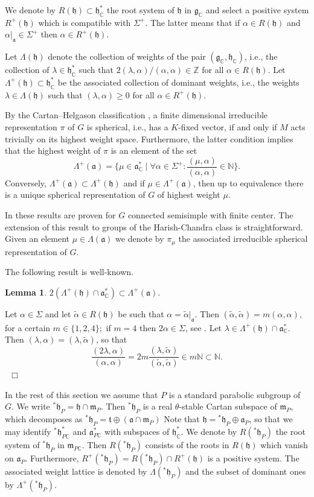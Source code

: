 \documentclass[12pt,a4paper]{article}
\newtheorem{Lemma}[Thm]{Lemma}
\newenvironment{lemma}[0]{\begin{Lemma}\noindent}%
{\end{Lemma}}
\def\proof{\par\noindent{\it Proof.}{\ }{\ }}
\def\qed{~\hfill\hbox{$\Box$}\medbreak}
\def\msy#1{{\mathbb #1}}
\def\C{{\msy C}}
\def\N{{\msy N}}
\def\Z{{\msy Z}}
\def\ga{\alpha}
\def\gl{\lambda}
\def\gS{\Sigma}
\def\got#1{\mathfrak #1}
\def\fa{{\got a}}
\def\fg{{\got g}}
\def\fh{{\got h}}
\def\fm{{\got m}}
\def\ft{{\got t}}
\def\iC{{\scriptscriptstyle \C}}
\numberwithin{Thm}{section}
\numberwithin{equation}{section}
\def\fadc{\fa_\C^*}
\def\faPdc{{\fa_{P\iC}^*}}
\def\gL{\Lambda}
\def\fhdc{\fh_\iC^*}
\def\Cartan{\theta}
\numberwithin{equation}{section}
\def\gL{\Lambda}
\def\ft{\mathfrak t}
\def\fhdc{\fh_\iC^*}
\def\faPdc{\fa_{P\iC}^*}
\def\fh{{\mathfrak h}}
\def\Cartan{\theta}
\def\Rinp#1#2{(#1,#2)}
\begin{document}
We denote by $R(\fh)\subset \fhdc$ the root system of $\fh$ in $\fg_\iC$ 
and select a positive system $R^+(\fh)$ which is compatible with $\gS^+.$
The latter means that if $\ga \in R(\fh)$ and  $\ga|_\fa \in \gS^+$ 
then $\ga \in R^+(\fh).$ 

Let $\gL(\fh)$ denote the collection of weights of the pair $(\fg_\iC, \fh_\iC)$, 
i.e., the collection of $\gl \in \fhdc$ such that $2\Rinp{\gl}{\ga}/\Rinp{\ga}{\ga} \in \Z$ 
for all $\ga \in R(\fh).$ 
Let $\gL^+(\fh) \subset \fhdc$ be the associated
collection of dominant weights, i.e., the weights $\gl \in \gL(\fh)$ such that $\Rinp{\gl}{\ga} \geq 0 $ for all $\ga \in R^+(\fh).$ 

By the Cartan--Helgason classification 
\cite[Ch. 5, Thm. 4.1]{HelgasonGGA}, a finite dimensional irreducible 
representation $\pi$ of $G$ is spherical, i.e., has a $K$-fixed vector, if and only if $M$ acts trivially on its highest weight space. Furthermore, the latter condition implies that the highest weight of $\pi$ is an element of the set
$$ 
\gL^+(\fa) = \{\mu \in \fadc \mid \forall \ga\in \gS^+: \frac{\Rinp{\mu}{\ga}}{\Rinp{\ga}{\ga}} \in \N\}.
$$ 
Conversely, $\gL^+(\fa) \subset \gL^+(\fh)$ and if $\mu \in \gL^+(\fa)$, then up to equivalence there is a unique spherical representation of $G$ of highest weight $\mu.$ 


In \cite{HelgasonGGA} these results are proven for $G$ connected semisimple with 
finite center. The extension of this result to groups of the Harish-Chandra class is 
straightforward. Given an element $\mu \in \gL(\fa)$ we denote by 
$\pi_\mu$ the associated irreducible spherical representation of $G.$ 
  
The following result  is well-known.
\begin{lemma}
\label{l: double weight lattice}
$2 (\gL^+(\fh) \cap \fadc) \subset \gL^+(\fa).$
\end{lemma}
\proof
Let $\ga \in \gS$ and let $\tilde \ga \in R(\fh)$ be such that  $\ga = \tilde \ga|_{\fa}.$ Then 
$\Rinp{\tilde \ga}{\tilde \ga} = m \Rinp{\ga}{\ga}$, for a certain $m \in \{1,2,4\};$ if $m =4$ then $2\ga \in \gS$, see \cite[Ch. VII, Lemma 8.4]{HelgasonDS}.
Let $\gl \in\gL^+(\fh) \cap \fadc.$ Then $\Rinp{\gl}{\ga} = \Rinp{\gl}{\tilde \ga}$, so that 
$$ 
\frac{\Rinp{2 \gl}{\ga}}{\Rinp{\ga}{\ga}} = 2m \frac{\Rinp{\gl}{\tilde \ga}}{\Rinp{\tilde \ga}{\tilde \ga}} \in m\N \subset \N.
$$ 
\qed 

%
In the rest of this section we assume that $P$ is a standard parabolic subgroup of $G$. We write ${}^*\fh_P = \fh \cap \fm_P.$ Then ${}^*\fh_P$ 
is a real $\Cartan$-stable Cartan subspace of $\fm_P$, which decomposes as 
${}^*\fh_P = \ft \oplus (\fa \cap \fm_P)$ Note that $\fh = {}^*\fh_P \oplus \fa_P$, so that we may identify
${}^*\fh_{P\iC}^*$ and $\faPdc$ with subspaces of $\fhdc.$ We denote by $R({}^*\fh_P)$ the root system 
of ${}^*\fh_P$ in $\fm_{P\iC}.$ Then $R({}^*\fh_P)$ consists of the roots in $R(\fh)$ which vanish on $\fa_P.$ 
Furthermore, $R^{+}({}^*\fh_P) = R({}^*\fh_P) \cap R^+(\fh)$ is a positive system. The associated
weight lattice  is denoted by $\gL({}^*\fh_P)$ and the subset of dominant
ones by $\gL^+({}^*\fh_P).$ 
\end{document}
